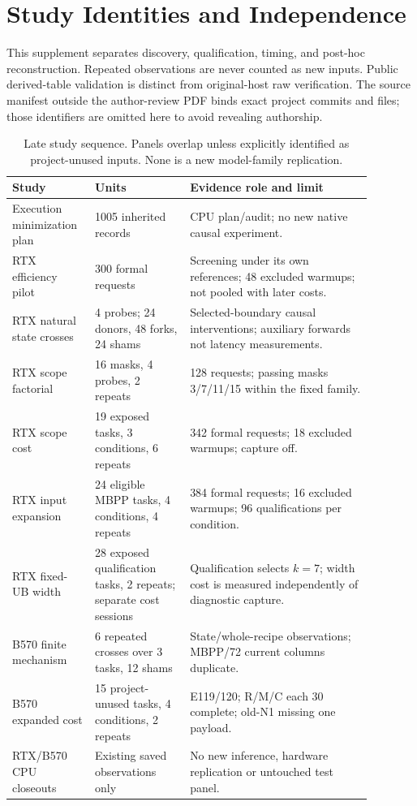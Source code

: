 \section{Study Identities and Independence}

This supplement separates discovery, qualification, timing, and post-hoc reconstruction. Repeated observations are never counted as new inputs. Public derived-table validation is distinct from original-host raw verification. The source manifest outside the author-review PDF binds exact project commits and files; those identifiers are omitted here to avoid revealing authorship.

\begin{table}[htbp]\centering\small
\caption{Late study sequence. Panels overlap unless explicitly identified as project-unused inputs. None is a new model-family replication.}
\begin{tabular}{p{0.18\linewidth}p{0.24\linewidth}p{0.46\linewidth}}\toprule
Study & Units & Evidence role and limit\\\midrule
Execution minimization plan & 1005 inherited records & CPU plan/audit; no new native causal experiment.\\
RTX efficiency pilot & 300 formal requests & Screening under its own references; 48 excluded warmups; not pooled with later costs.\\
RTX natural state crosses & 4 probes; 24 donors, 48 forks, 24 shams & Selected-boundary causal interventions; auxiliary forwards not latency measurements.\\
RTX scope factorial & 16 masks, 4 probes, 2 repeats & 128 requests; passing masks 3/7/11/15 within the fixed family.\\
RTX scope cost & 19 exposed tasks, 3 conditions, 6 repeats & 342 formal requests; 18 excluded warmups; capture off.\\
RTX input expansion & 24 eligible MBPP tasks, 4 conditions, 4 repeats & 384 formal requests; 16 excluded warmups; 96 qualifications per condition.\\
RTX fixed-UB width & 28 exposed qualification tasks, 2 repeats; separate cost sessions & Qualification selects $k=7$; width cost is measured independently of diagnostic capture.\\
B570 finite mechanism & 6 repeated crosses over 3 tasks, 12 shams & State/whole-recipe observations; MBPP/72 current columns duplicate.\\
B570 expanded cost & 15 project-unused tasks, 4 conditions, 2 repeats & E119/120; R/M/C each 30 complete; old-N1 missing one payload.\\
RTX/B570 CPU closeouts & Existing saved observations only & No new inference, hardware replication or untouched test panel.\\\bottomrule
\end{tabular}\end{table}

